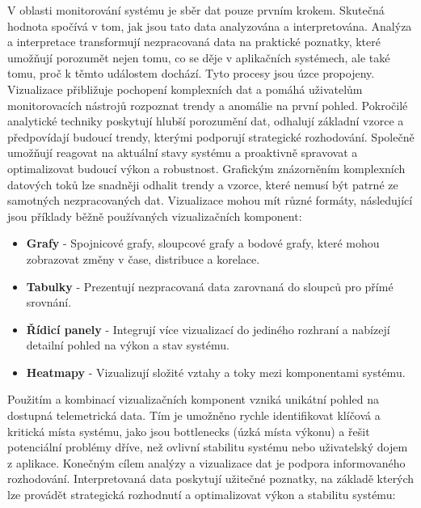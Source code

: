 
V oblasti monitorování systému je sběr dat pouze prvním krokem. Skutečná hodnota spočívá v tom, jak jsou tato data analyzována a interpretována. Analýza a interpretace transformují nezpracovaná data na praktické poznatky, které umožňují porozumět nejen tomu, co se děje v aplikačních systémech, ale také tomu, proč k těmto událostem dochází. \cite{Majors2022} Tyto procesy jsou úzce propojeny. Vizualizace přibližuje pochopení komplexních dat a pomáhá uživatelům monitorovacích nástrojů rozpoznat trendy a anomálie na první pohled. Pokročilé analytické techniky poskytují hlubší porozumění dat, odhalují základní vzorce a předpovídají budoucí trendy, kterými podporují strategické rozhodování. Společně umožňují reagovat na aktuální stavy systému a proaktivně spravovat a optimalizovat budoucí výkon a robustnost. Grafickým znázorněním komplexních datových toků lze snadněji odhalit trendy a vzorce, které nemusí být patrné ze samotných nezpracovaných dat. Vizualizace mohou mít různé formáty, následující jsou příklady běžně používaných vizualizačních komponent:

\begin{itemize}
    \item \textbf{Grafy} - Spojnicové grafy, sloupcové grafy a bodové grafy, které mohou zobrazovat změny v čase, distribuce a korelace.
    \item \textbf{Tabulky} - Prezentují nezpracovaná data zarovnaná do sloupců pro přímé srovnání.
    \item \textbf{Řídicí panely} - Integrují více vizualizací do jediného rozhraní a nabízejí detailní pohled na výkon a stav systému.
    \item \textbf{Heatmapy} - Vizualizují složité vztahy a toky mezi komponentami systému.
\end{itemize}

Použitím a kombinací vizualizačních komponent vzniká unikátní pohled na dostupná telemetrická data. Tím je umožněno rychle identifikovat klíčová a kritická místa systému, jako jsou bottlenecks (úzká místa výkonu) a řešit potenciální problémy dříve, než ovlivní stabilitu systému nebo uživatelský dojem z aplikace. \cite{Chapman2023} Konečným cílem analýzy a vizualizace dat je podpora informovaného rozhodování. Interpretovaná data poskytují užitečné poznatky, na základě kterých lze provádět strategická rozhodnutí a optimalizovat výkon a stabilitu systému:

